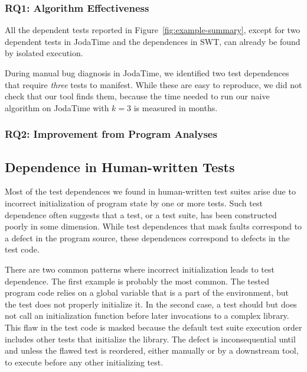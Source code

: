 \subsubsection{RQ1: Algorithm Effectiveness}

All the dependent tests reported in Figure~\ref{fig:example-summary},
except for two dependent tests in JodaTime and the dependences in SWT, 
can already be found by isolated execution.
 
During manual bug diagnosis in JodaTime, we identified two test dependences that require
\emph{three} tests to manifest. While these are easy to reproduce, we
did not check that our tool finds them, because the time needed to
run our naive algorithm on JodaTime with $k=3$ is measured in months.


\subsubsection{RQ2: Improvement from Program Analyses}

\subsection{Dependence in Human-written Tests}


Most of the test dependences we found in human-written
test suites arise due to incorrect initialization
of program state by one or more tests. Such test
dependence often suggests that a test, or a test suite, 
has been constructed poorly in some dimension. 
While test dependences that mask faults
correspond to a defect in the program source,
these dependences correspond to defects in the test code.

There are two common patterns where incorrect
initialization leads to test dependence.
The first example is probably the most common. 
The tested program code relies on a
global variable that is a part of the environment, but the test does
not properly initialize it.  In the second case, a test should but
does not call
an initialization function before later invocations to a complex library.
This flaw in the test code is masked because the default test suite execution
order includes other tests that initialize the library.  The defect is
inconsequential until and unless the flawed test is reordered, either manually or by
a downstream tool, to execute before any other initializing test.

